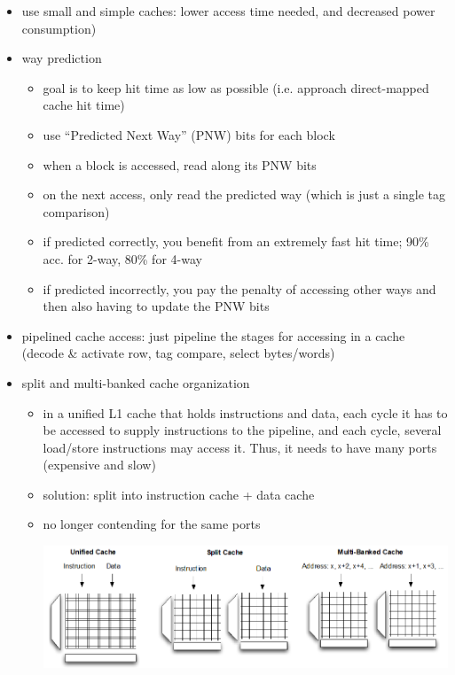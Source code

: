 \documentclass[12pt]{extarticle}
\begin{document}
	\begin{itemize}
		\item use small and simple caches: lower access time needed, and decreased power consumption)
		\item way prediction
		\begin{itemize}
			\item goal is to keep hit time as low as possible (i.e. approach direct-mapped cache hit time)
			\item use ``Predicted Next Way'' (PNW) bits for each block
			\item when a block is accessed, read along its PNW bits
			\item on the next access, only read the predicted way (which is just a single tag comparison)
			\item if predicted correctly, you benefit from an extremely fast hit time; 90\% acc. for 2-way, 80\% for 4-way
			\item if predicted incorrectly, you pay the penalty of accessing other ways and then also having to update 
			the PNW bits
		\end{itemize}

		\item pipelined cache access: just pipeline the stages for accessing in a cache (decode \& activate row, tag compare, select bytes/words)
		\item split and multi-banked cache organization
		\begin{itemize}
			\item in a unified L1 cache that holds instructions and data, each cycle it has to be accessed to supply instructions 
			to the pipeline, and each cycle, several load/store instructions may access it. Thus, it needs to have many ports 
			(expensive and slow)
			\item solution: split into instruction cache + data cache
			\item no longer contending for the same ports
			
			\begin{center}
				\includegraphics[scale=0.6]{assets/unified-split-multibank.png}
			\end{center}
		\end{itemize}

	\end{itemize}
\end{document}
